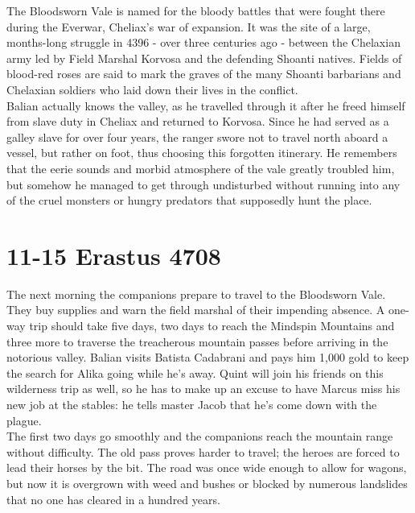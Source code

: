 The Bloodsworn Vale is named for the bloody battles that were fought there during the Everwar, Cheliax's war of expansion. It was the site of a large, months-long struggle in 4396 - over three centuries ago - between the Chelaxian army led by Field Marshal Korvosa and the defending Shoanti natives. Fields of blood-red roses are said to mark the graves of the many Shoanti barbarians and Chelaxian soldiers who laid down their lives in the conflict.\\

Balian actually knows the valley, as he travelled through it after he freed himself from slave duty in Cheliax and returned to Korvosa. Since he had served as a galley slave for over four years, the ranger swore not to travel north aboard a vessel, but rather on foot, thus choosing this forgotten itinerary. He remembers that the eerie sounds and morbid atmosphere of the vale greatly troubled him, but somehow he managed to get through undisturbed without running into any of the cruel monsters or hungry predators that supposedly hunt the place.\\

\section{11-15 Erastus 4708}

The next morning the companions prepare to travel to the Bloodsworn Vale. They buy supplies and warn the field marshal of their impending absence. A one-way trip should take five days, two days to reach the Mindspin Mountains and three more to traverse the treacherous mountain passes before arriving in the notorious valley. Balian visits Batista Cadabrani and pays him 1,000 gold to keep the search for Alika going while he's away. Quint will join his friends on this wilderness trip as well, so he has to make up an excuse to have Marcus miss his new job at the stables: he tells master Jacob that he's come down with the plague.\\

The first two days go smoothly and the companions reach the mountain range without difficulty. The old pass proves harder to travel; the heroes are forced to lead their horses by the bit. The road was once wide enough to allow for wagons, but now it is overgrown with weed and bushes or blocked by numerous landslides that no one has cleared in a hundred years.\\

